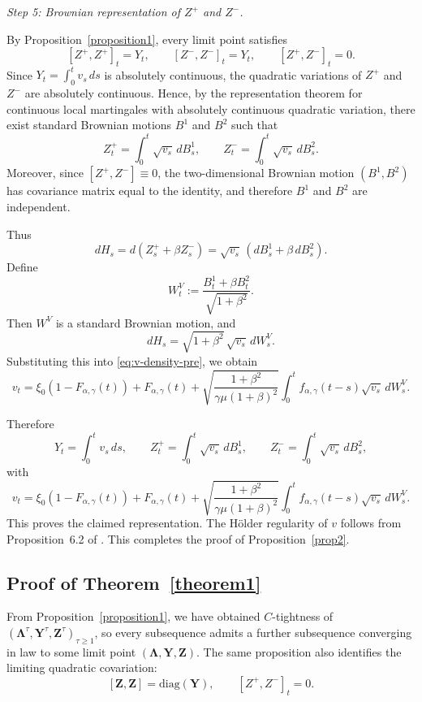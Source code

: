 \documentclass[letterpaper]{article}
\numberwithin{equation}{section}
\theoremstyle{definition}
\theoremstyle{remark}
\begin{document}
\medskip
\noindent
\textit{Step 5: Brownian representation of $Z^+$ and $Z^-$.}

By Proposition~\ref{proposition1}, every limit point satisfies
\[
  [Z^+,Z^+]_t=Y_t,\qquad [Z^-,Z^-]_t=Y_t,\qquad [Z^+,Z^-]_t=0.
\]
Since $Y_t=\int_0^t v_s\,ds$ is absolutely continuous, the quadratic variations
of $Z^+$ and $Z^-$ are absolutely continuous. Hence, by the representation theorem
for continuous local martingales with absolutely continuous quadratic variation,
there exist standard Brownian motions $B^1$ and $B^2$ such that
\[
  Z_t^+=\int_0^t\sqrt{v_s}\,dB_s^1,
  \qquad
  Z_t^-=\int_0^t\sqrt{v_s}\,dB_s^2.
\]
Moreover, since $[Z^+,Z^-]\equiv0$, the two-dimensional Brownian motion
$(B^1,B^2)$ has covariance matrix equal to the identity, and therefore
$B^1$ and $B^2$ are independent.

Thus
\[
  dH_s
  =
  d(Z_s^++\beta Z_s^-)
  =
  \sqrt{v_s}\,\left(dB_s^1+\beta\,dB_s^2\right).
\]
Define
\[
  W_t^V:=\frac{B_t^1+\beta B_t^2}{\sqrt{1+\beta^2}}.
\]
Then $W^V$ is a standard Brownian motion, and
\[
  dH_s=\sqrt{1+\beta^2}\,\sqrt{v_s}\,dW_s^V.
\]
Substituting this into \eqref{eq:v-density-pre}, we obtain
\[
  v_t
  =
  \xi_0\left(1-F_{\alpha,\gamma}(t)\right)
  +
  F_{\alpha,\gamma}(t)
  +
  \sqrt{\frac{1+\beta^2}{\gamma\mu(1+\beta)^2}}
  \int_0^t
  f_{\alpha,\gamma}(t-s)\sqrt{v_s}\,dW_s^V.
\]

Therefore
\[
  Y_t=\int_0^t v_s\,ds,
  \qquad
  Z_t^+=\int_0^t\sqrt{v_s}\,dB_s^1,
  \qquad
  Z_t^-=\int_0^t\sqrt{v_s}\,dB_s^2,
\]
with
\[
  v_t
  =
  \xi_0\left(1-F_{\alpha,\gamma}(t)\right)
  +
  F_{\alpha,\gamma}(t)
  +
  \sqrt{\frac{1+\beta^2}{\gamma\mu(1+\beta)^2}}
  \int_0^t
  f_{\alpha,\gamma}(t-s)\sqrt{v_s}\,dW_s^V.
\]
This proves the claimed representation. The H\"older regularity of $v$
follows from Proposition~6.2 of \cite{el2019characteristic}. This completes
the proof of Proposition~\ref{prop2}.

\subsection{Proof of Theorem~\ref{theorem1}}\label{app:inar-moment}

From Proposition~\ref{proposition1}, we have obtained $C$-tightness of $(\boldsymbol\Lambda^{\tau},\mathbf Y^{\tau},\mathbf Z^{\tau})_{\tau\ge1}$, so every subsequence admits a further subsequence converging in law to some limit point $(\boldsymbol\Lambda,\mathbf Y,\mathbf Z)$. The same proposition also identifies the limiting quadratic covariation:
\[
  [\mathbf Z,\mathbf Z]=\mathrm{diag}(\mathbf Y),
  \qquad
  [Z^+,Z^-]_t=0.
\]
\end{document}
